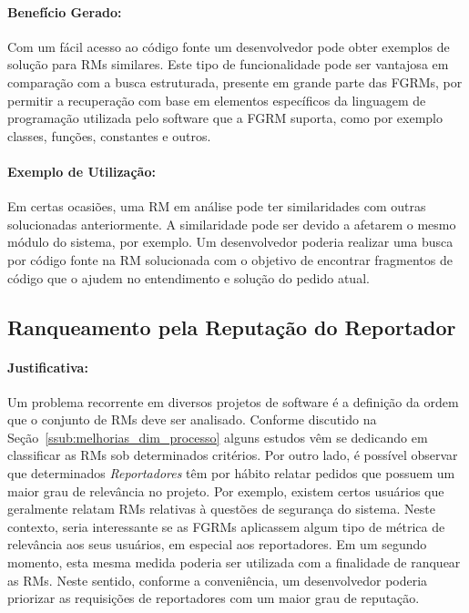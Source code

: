\paragraph{Benefício Gerado:}
\label{par:beneficios_s02}

Com um fácil acesso ao código fonte um desenvolvedor pode obter exemplos de
solução para RMs similares. Este tipo de funcionalidade pode ser vantajosa em
comparação com a busca estruturada, presente em grande parte das FGRMs, por
permitir a recuperação com base em elementos específicos da linguagem de
programação utilizada pelo software que a FGRM suporta, como por exemplo
classes, funções, constantes e outros.

\paragraph{Exemplo de Utilização:}
\label{par:exemplo_s02}

Em certas ocasiões, uma RM em análise pode ter similaridades com outras
solucionadas anteriormente. A similaridade pode ser devido a afetarem o mesmo
módulo do sistema, por exemplo. Um desenvolvedor poderia realizar uma busca por
código fonte na RM solucionada com o objetivo de encontrar fragmentos de código
que o ajudem no entendimento e solução do pedido atual.

\subsection{Ranqueamento pela Reputação do Reportador}
\label{sub:diferenciacao_do_reportdor}


\paragraph{Justificativa:}
\label{par:justificativa_s03}

Um problema recorrente em diversos projetos de software é a definição da ordem
que o conjunto de RMs deve ser analisado. Conforme discutido na
Seção~\ref{ssub:melhorias_dim_processo} alguns estudos vêm se dedicando em
classificar as RMs sob determinados critérios. Por outro lado, é possível
observar que determinados \textit{Reportadores} têm por hábito relatar pedidos
que possuem um maior grau de relevância no projeto. Por exemplo, existem certos
usuários que geralmente relatam RMs relativas à questões de segurança do
sistema. Neste contexto, seria interessante se as FGRMs aplicassem algum tipo de
métrica de relevância aos seus usuários, em especial aos reportadores. Em um
segundo momento, esta mesma medida poderia ser utilizada com a finalidade de
ranquear as RMs. Neste sentido, conforme a conveniência, um desenvolvedor
poderia priorizar as requisições de reportadores com um maior grau de reputação.

